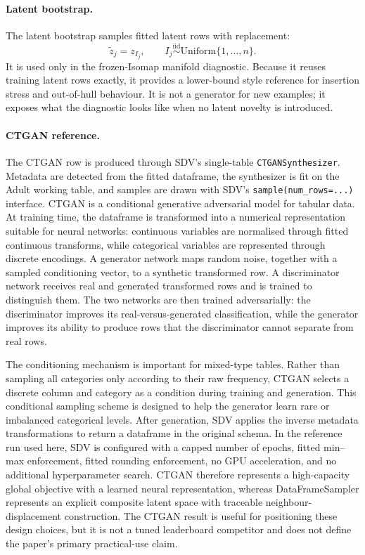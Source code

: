 \paragraph{Latent bootstrap.}
The latent bootstrap samples fitted latent rows with replacement:
\[
  \widetilde{z}_j=z_{I_j},
  \qquad
  I_j\overset{\mathrm{iid}}{\sim}\mathrm{Uniform}\{1,\ldots,n\}.
\]
It is used only in the frozen-Isomap manifold diagnostic. Because it reuses
training latent rows exactly, it provides a lower-bound style reference for
insertion stress and out-of-hull behaviour. It is not a generator for new
examples; it exposes what the diagnostic looks like when no latent novelty is
introduced.

\paragraph{CTGAN reference.}
The CTGAN row is produced through SDV's single-table
\texttt{CTGANSynthesizer}. Metadata are detected from the fitted dataframe,
the synthesizer is fit on the Adult working table, and samples are drawn with
SDV's \texttt{sample(num\_rows=...)} interface. CTGAN is a conditional
generative adversarial model for tabular data. At training time, the dataframe
is transformed into a numerical representation suitable for neural networks:
continuous variables are normalised through fitted continuous transforms, while
categorical variables are represented through discrete encodings. A generator
network maps random noise, together with a sampled conditioning vector, to a
synthetic transformed row. A discriminator network receives real and generated
transformed rows and is trained to distinguish them. The two networks are then
trained adversarially: the discriminator improves its real-versus-generated
classification, while the generator improves its ability to produce rows that
the discriminator cannot separate from real rows.

The conditioning mechanism is important for mixed-type tables. Rather than
sampling all categories only according to their raw frequency, CTGAN selects a
discrete column and category as a condition during training and generation.
This conditional sampling scheme is designed to help the generator learn rare
or imbalanced categorical levels. After generation, SDV applies the inverse
metadata transformations to return a dataframe in the original schema. In the
reference run used here, SDV is configured with a capped number of epochs,
fitted min--max enforcement, fitted rounding enforcement, no GPU acceleration,
and no additional hyperparameter search. CTGAN therefore represents a
high-capacity global objective with a learned neural representation, whereas
DataFrameSampler represents an explicit composite latent space with traceable
neighbour-displacement construction. The CTGAN result is useful for
positioning these design choices, but it is not a tuned leaderboard competitor
and does not define the paper's primary practical-use claim.

